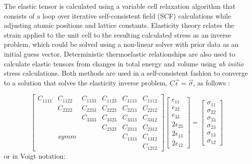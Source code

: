 \documentclass[final,3p,times]{elsarticle}
\begin{document}
The elastic tensor is calculated using a variable cell relaxation algorithm that consists of a loop over iterative self-consistent field (SCF) calculations while adjusting atomic positions and lattice constants. Elasticity theory relates the strain applied to the unit cell to the resulting calculated stress as an inverse problem, which could be solved using a non-linear solver with prior data as an initial guess vector. Deterministic thermoelastic relationships are also used to calculate elastic tensors from changes in total energy and volume using \textit{ab initio} stress calculations. Both methods are used in a self-consistent fashion to converge to a solution that solves the elasticity inverse problem, $\underline{C}\vec{\epsilon} = \vec{\sigma}$, as follows \cite{timoshenko1951theory, mit1620}:

\begin{equation} \label{eqn:stiffness-full-notation}
\begin{bmatrix}
C_{1111} & C_{1122} & C_{1133} & C_{1123} & C_{1113} & C_{1112} \\
 & C_{2222} & C_{2233} & C_{2223} & C_{2213} & C_{2212} \\
 &  & C_{3333} & C_{3323} & C_{3313} & C_{3312} \\
 &  &  & C_{2323} & C_{2313} & C_{2312} \\
 & symm &  &  & C_{1313} & C_{1312} \\
 &  &  &  &  & C_{1212}
\end{bmatrix} \begin{bmatrix}
\epsilon_{11} \\
\epsilon_{22} \\
\epsilon_{33} \\
2\epsilon_{23} \\
2\epsilon_{13} \\
2\epsilon_{12}
\end{bmatrix}  =  \begin{bmatrix}
\sigma_{11} \\
\sigma_{22} \\
\sigma_{33} \\
\sigma_{23} \\
\sigma_{13} \\
\sigma_{12}
\end{bmatrix}
\end{equation}
or in Voigt notation:
\end{document}
